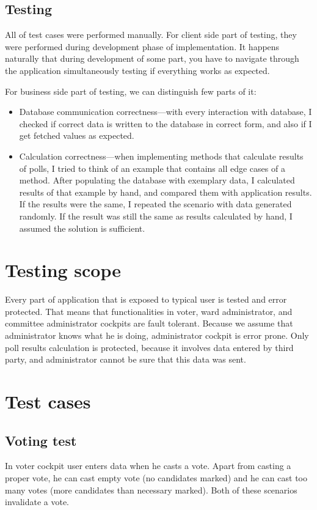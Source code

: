 \documentclass[a4paper,twoside,12pt]{book}
\begin{document}
      \subsection{Testing}
        All of test cases were performed manually.
        For client side part of testing, they were performed during development phase of implementation.
        It happens naturally that during development of some part, you have to navigate through the application simultaneously testing if everything works as expected.

        For business side part of testing, we can distinguish few parts of it:
        \begin{itemize}
          \item Database communication correctness---with every interaction with database, I checked if correct data is written to the database in correct form,
          and also if I get fetched values as expected.
          \item Calculation correctness---when implementing methods that calculate results of polls, I tried to think of an example that contains all edge cases of a method.
          After populating the database with exemplary data, I calculated results of that example by hand, and compared them with application results.
          If the results were the same, I repeated the scenario with data generated randomly. 
          If the result was still the same as results calculated by hand, I assumed the solution is sufficient.  
        \end{itemize}

  \section{Testing scope}
    Every part of application that is exposed to typical user is tested and error protected. 
    That means that functionalities in voter, ward administrator, and committee administrator cockpits are fault tolerant.
    Because we assume that administrator knows what he is doing, administrator cockpit is error prone. 
    Only poll results calculation is protected, because it involves data entered by third party, and administrator cannot be sure that this data was sent.

  \section{Test cases}
    \subsection{Voting test}
      In voter cockpit user enters data when he casts a vote. Apart from casting a proper vote, he can cast empty vote (no candidates marked) and
      he can cast too many votes (more candidates than necessary marked). Both of these scenarios invalidate a vote.
\end{document}
